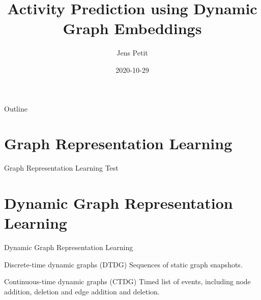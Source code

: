 \documentclass[
  8pt,
  ignorenonframetext,
  aspectratio=43,
]{beamer}
\title{Activity Prediction using Dynamic Graph Embeddings}
\author{Jens Petit}
\date{2020-10-29}
\begin{document}
\frame{\titlepage}

\begin{frame}{Outline}
\protect\hypertarget{outline}{}
\tableofcontents
\end{frame}

\hypertarget{graph-representation-learning}{%
\section{Graph Representation
Learning}\label{graph-representation-learning}}

\begin{frame}{Graph Representation Learning}
\protect\hypertarget{graph-representation-learning-1}{}
Test
\end{frame}

\hypertarget{dynamic-graph-representation-learning}{%
\section{Dynamic Graph Representation
Learning}\label{dynamic-graph-representation-learning}}

\begin{frame}{Dynamic Graph Representation Learning}
\protect\hypertarget{dynamic-graph-representation-learning-1}{}
\begin{block}{Discrete-time dynamic graphs (DTDG)}
\protect\hypertarget{discrete-time-dynamic-graphs-dtdg}{}
Sequences of static graph snapshots.
\end{block}

\begin{block}{Continuous-time dynamic graphs (CTDG)}
\protect\hypertarget{continuous-time-dynamic-graphs-ctdg}{}
Timed list of events, including node addition, deletion and edge
addition and deletion.
\end{block}
\end{frame}
\end{document}
